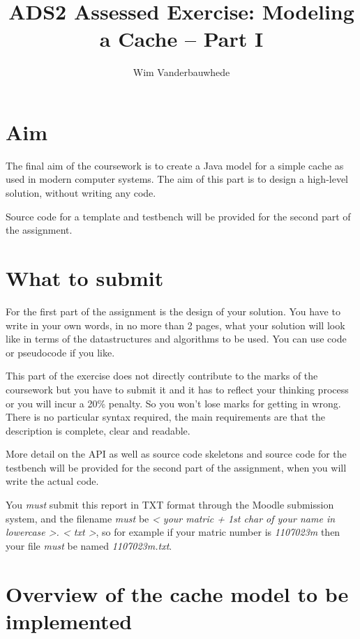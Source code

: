 \documentclass[11pt]{article}
\title{ADS2 Assessed Exercise: Modeling a Cache -- Part I}
\author{Wim Vanderbauwhede}
\date{\vspace{-5ex}}                                           %
\begin{document}
\maketitle


\section{Aim}\label{aim}

The final aim of the coursework is to create a Java model for a simple cache as used in modern computer systems. The aim of this part is to design a high-level solution, without writing any code.

Source code for a template and  testbench will be provided for the second part of the assignment.

\section{What to submit}\label{what-to-submit}

For the first part of the assignment is the design of your solution. You have to write in your own words, in no more than 2 pages, what your solution will look like in terms of the datastructures and algorithms to be used. You can use code or pseudocode if you like.
 
This part of the exercise does not directly contribute to the marks of the coursework but you have to submit it and it has to reflect your thinking process or you will incur a 20\% penalty.  So you won't lose marks for getting in wrong. There is no particular syntax required, the main requirements are that the description is complete, clear and readable. 

More detail on the API as well as source code skeletons and source code for the testbench will be provided for the second part of the assignment, when you will write the actual code.

You \emph{must} submit this report  in TXT format through the
Moodle submission system, and the filename \emph{must} be
\emph{\textless{} your matric + 1st char of your name in lowercase
\textgreater{}. \textless{} txt \textgreater{}}, so for example
if your matric number is \emph{1107023m} then your file \emph{must} be
named \emph{1107023m.txt}.

\section{Overview of the cache model to be implemented}\label{overview-of-the-cache}
\end{document}
